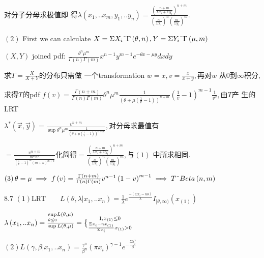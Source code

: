\documentclass{ctexart}
\def\QATOPD#1#2#3#4{{#3 \atopwithdelims#1#2 #4}}%
\begin{document}
对分子分母求极值即%
得$\lambda \left( x_{1},..x_{m},y_{1},..y_{n}\right) =\frac{\left( 
\frac{n+m}{\Sigma x_{i}+\Sigma y_{i}}\right) ^{n+m}}{\left( \frac{n}{\Sigma
x_{i}}\right) ^{n}\left( \frac{m}{\Sigma y_{i}}\right) ^{m}}.$

$\left( 2\right) $ First we can calculate $X=\Sigma X_{i}\symbol{126}\Gamma
\left( \theta ,n\right) ,Y=\Sigma Y_{i}\symbol{126}\Gamma \left( \mu
,m\right) $

$\left( X,Y\right) $ joined pdf: $\frac{\theta ^{n}\mu ^{m}}{\Gamma \left(
n\right) \Gamma \left( m\right) }x^{n-1}y^{m-1}e^{-\theta x-\mu y}dxdy$

求$T=\frac{X}{X+Y}$的分布只需做%
一个transformation $w=x,v=\frac{x}{x+y},$再对$w$%
从0到$\infty $积分,

求得$T$的pdf $f\left( v\right) =\frac{\Gamma \left(
n+m\right) }{\Gamma \left( n\right) \Gamma \left( m\right) }\theta ^{n}\mu
^{m}\frac{1}{\left( \theta +\mu \left( \frac{1}{v}-1\right) \right) ^{n+m}}%
\left( \frac{1}{v}-1\right) ^{m-1}\frac{1}{v^{2}},$由$T$产%
生的LRT

$\lambda ^{\ast }\left( \vec{x},\vec{y}\right) =\frac{v^{n+m}}{\sup \theta
^{n}\mu ^{m}\frac{1}{\left( \theta +\mu \left( \frac{1}{v}-1\right) \right)
^{n+m}}},$对分母求最值有

$=\frac{v^{n+m}}{\frac{m^{m}n^{n}}{\left( \frac{1}{v}-1\right) ^{m}\left(
m+n\right) ^{m+n}}}$化简得$=\frac{\left( \frac{n+m}{\Sigma
x_{i}+\Sigma y_{i}}\right) ^{n+m}}{\left( \frac{n}{\Sigma x_{i}}\right)
^{n}\left( \frac{m}{\Sigma y_{i}}\right) ^{m}},$与$\left( 1\right) $%
中所求相同$.$

$\left( 3\right) \theta =\mu \implies f\left( v\right) =\frac{\Gamma \left(
n+m\right) }{\Gamma \left( n\right) \Gamma \left( m\right) }v^{n-1}\left(
1-v\right) ^{m-1}\implies T\symbol{126}Beta\left( n,m\right) $

8.7 $\left( 1\right) $LRT$\qquad L\left( \theta ,\lambda
|x_{1},..x_{n}\right) =\frac{1}{\lambda }e^{\frac{-\left( \Sigma
x_{i}-n\theta \right) }{\lambda }}I_{[\theta ,\infty )}\left( x_{\left(
1\right) }\right) $

$\lambda \left( x_{1},..x_{n}\right) =\frac{\underset{\theta \leq 0}{\sup }%
L\left( \theta ,\mu \right) }{\sup L\left( \theta ,\mu \right) }=\QATOPD\{ .
{1,x_{\left( 1\right) }\leq 0}{\frac{\Sigma x_{i}-nx_{\left( 1\right) }}{%
\Sigma x_{i}}x_{\left( 1\right) }>0}$

$\left( 2\right) L\left( \gamma ,\beta |x_{1},..x_{n}\right) =\frac{\gamma
^{n}}{\beta ^{n}}\left( \pi x_{i}\right) ^{\gamma -1}e^{-\frac{\Sigma
x_{i}^{\gamma }}{\beta }}$
\end{document}
